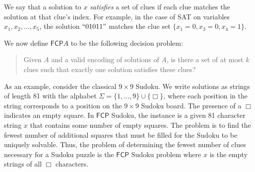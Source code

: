 \documentclass[runningheads,a4paper]{llncs}
\begin{document}
We say that a solution to $x$ \emph{satisfies} a set of clues if each clue matches the solution at that clue's index. For example, in the case of SAT on variables $x_1,x_2,\dots,x_5$, the solution $``01011"$ matches the clue set $\{x_1 = 0,x_3 = 0,x_4 = 1\}$.

We now define $\mathsf{FCP} A$ to be the following decision problem:
\begin{quote}
Given $A$ and a valid encoding of solutions of $A$, is there a set of at most $k$ clues such that exactly one solution satisfies these clues?
\end{quote}
%
%
%

As an example, consider the classical $9 \times 9$ Sudoku. We write solutions as strings of length 81 with the alphabet $\Sigma = \{ 1, ..., 9 \} \cup \{ \Box \}$, where each position in the string corresponds to a position on the $9 \times 9$ Sudoku board. The presence of a $\Box$ indicates an empty square. In $\mathsf{FCP}$ Sudoku, the instance is a given 81 character string $x$ that contains some number of empty squares. The problem is to find the fewest number of additional squares that must be filled for the Sudoku to be uniquely solvable. Thus, the problem of determining the fewest number of clues necessary for a Sudoku puzzle is the $\mathsf{FCP}$ Sudoku problem where $x$ is the empty strings of all $\Box$ characters.
\end{document}

